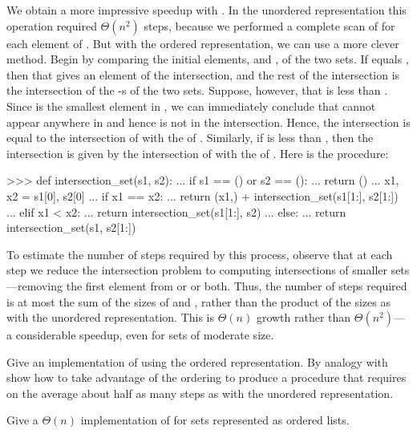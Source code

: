 We obtain a more impressive speedup with .  In the
unordered representation this operation required \( \Theta(n^2) \) steps,
because we performed a complete scan of  for each element of
.  But with the ordered representation, we can use a more clever
method.  Begin by comparing the initial elements,  and , of
the two sets.  If  equals , then that gives an element of the
intersection, and the rest of the intersection is the intersection of the
-s of the two sets.  Suppose, however, that  is less than
.  Since  is the smallest element in , we can
immediately conclude that  cannot appear anywhere in  and
hence is not in the intersection.  Hence, the intersection is equal to the
intersection of  with the  of .  Similarly, if
 is less than , then the intersection is given by the
intersection of  with the  of .  Here is the
procedure:

\begin{codeBlock}
>>> def intersection_set(s1, s2):
...     if s1 == () or s2 == ():
...         return ()
...     x1, x2 = s1[0], s2[0]
...     if x1 == x2:
...         return (x1,) + intersection_set(s1[1:], s2[1:])
...     elif x1 < x2:
...         return intersection_set(s1[1:], s2)
...     else:
...         return intersection_set(s1, s2[1:])
\end{codeBlock}

\noindent
To estimate the number of steps required by this process, observe that at each
step we reduce the intersection problem to computing intersections of smaller
sets---removing the first element from  or  or both.
Thus, the number of steps required is at most the sum of the sizes of
 and , rather than the product of the sizes as with the
unordered representation.  This is \( \Theta(n) \) growth rather than
\( \Theta(n^2) \)---a considerable speedup, even for sets of moderate size.

\begin{exerciseGroup}
\label{Exercise 2.61}
 Give an implementation of
 using the ordered representation.  By analogy with
 show how to take advantage of the ordering to
produce a
procedure that requires on the average about half as many steps as with the
unordered representation.

\label{Exercise 2.62}
 Give a \( \Theta(n) \)
implementation of  for sets represented as ordered lists.
\end{exerciseGroup}


